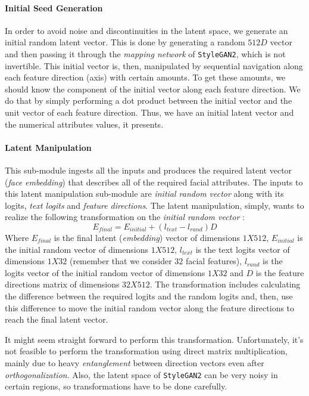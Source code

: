 \paragraph{Initial Seed Generation}
In order to avoid noise and discontinuities in the latent space, we generate an initial random latent vector. This is done by generating a random $512D$ vector and then passing it through the \emph{mapping network} of \texttt{StyleGAN2}, which is not invertible. This initial vector is, then, manipulated by sequential navigation along each feature direction (axis) with certain amounts. To get these amounts, we should know the component of the initial vector along each feature direction. We do that by simply performing a dot product between the initial vector and the unit vector of each feature direction. Thus, we have an initial latent vector and the numerical attributes values, it presents. 

\paragraph{Latent Manipulation}
This sub-module ingests all the inputs and produces the required latent vector (\emph{face embedding}) that describes all of the required facial attributes. The inputs to this latent manipulation sub-module are \emph{initial random vector} along with its logits, \emph{text logits} and \emph{feature directions}. The latent manipulation, simply, wants to realize the following transformation on the \emph{initial random vector} :
\begin{equation}
    E_{final} = E_{initial} + (l_{text} - l_{rand}) D
\end{equation}
Where $E_{final}$ is the final latent (\emph{embedding}) vector of dimensions $1X512$, $E_{initial}$ is the initial random vector of dimensions $1X512$, $l_{text}$ is the text logits vector of dimensions $1X32$ (remember that we consider $32$ facial features), $l_{rand}$ is the logits vector of the initial random vector of dimensions $1X32$ and $D$ is the feature directions matrix of dimensions $32X512$. The transformation includes calculating the difference between the required logits and the random logits and, then, use this difference to move the initial random vector along the feature directions to reach the final latent vector.

It might seem straight forward to perform this transformation. Unfortunately, it's not feasible to perform the transformation using direct matrix multiplication, mainly due to heavy \emph{entanglement} between direction vectors even after \emph{orthogonalization}. Also, the latent space of \texttt{StyleGAN2} can be very noisy in certain regions, so transformations have to be done carefully. 


